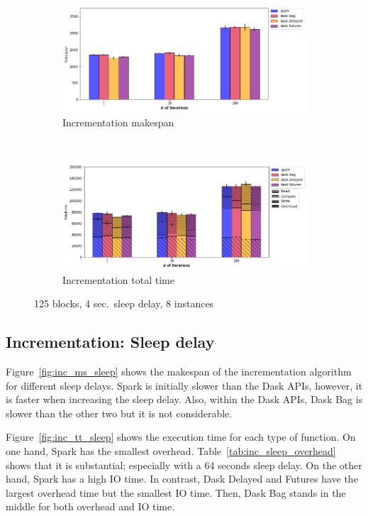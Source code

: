 \documentclass[conference]{IEEEtran}
\begin{document}
\begin{figure}[!t]
    \centering
    \begin{subfigure}[b]{\columnwidth}
        \includegraphics[clip,width=\columnwidth]{images/inc_itr.png}%
        \caption{Incrementation makespan}\label{fig:inc_ms_itr}
    \end{subfigure}
    \\
    \begin{subfigure}[b]{\columnwidth}
        \includegraphics[clip,width=\columnwidth]{images/inc_idle_itr.png}%
        \caption{Incrementation total time}\label{fig:inc_tt_itr}
    \end{subfigure}
    \caption{125 blocks, 4 sec.\ sleep delay, 8 instances}
\end{figure}


\subsection{Incrementation: Sleep delay}
Figure~\ref{fig:inc_ms_sleep} shows the makespan of the incrementation algorithm for
different sleep delays. Spark is initially slower than the Dask APIs, however, it is
faster when increasing the sleep delay. Also, within the Dask APIs, Dask Bag is
slower than the other two but it is not considerable.

Figure~\ref{fig:inc_tt_sleep} shows the execution time for each type of function. On
one hand, Spark has the smallest overhead. Table~\ref{tab:inc_sleep_overhead} shows
that it is substantial; especially with a 64 seconds sleep delay. On the other hand,
Spark has a high IO time. In contrast, Dask Delayed and Futures have the largest
overhead time but the smallest IO time. Then, Dask Bag stands in the middle for both
overhead and IO time.
\end{document}
